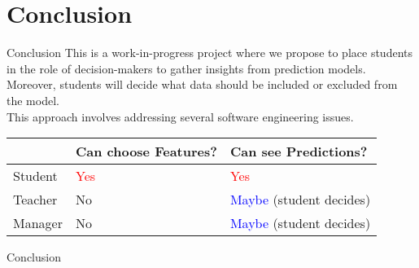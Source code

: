\section{Conclusion}

\begin{frame}{Conclusion}
    This is a work-in-progress project where we propose to place students in the role of 
    decision-makers to gather insights from prediction models. 
    \\
    Moreover, students will decide what data should be included or excluded from the model.
    \\
    This approach involves addressing several software engineering issues.

    \begin{table}[]
        \begin{tabular}{|l|l|l|} \hline
                 & Can choose Features?  & Can see Predictions?                    \\ \hline
         Student & \textcolor{red}{Yes}  & \textcolor{red}{Yes}                    \\ \hline
         Teacher & No                    & \textcolor{blue}{Maybe} (student decides) \\ \hline
         Manager & No                    & \textcolor{blue}{Maybe} (student decides) \\ \hline
        \end{tabular}
    \end{table}
\end{frame}

\begin{frame}{Conclusion}
\end{frame}

